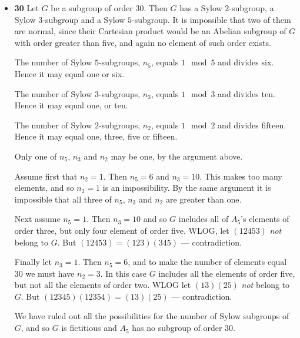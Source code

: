\documentclass[11pt]{article} \usepackage{amssymb}
\begin{document}
\begin{enumerate}
\begin{itemize}
    \item {\bf 30}
      Let $G$ be a subgroup of order 30. Then $G$ has a Sylow 
      $2$-subgroup, a Sylow $3$-subgroup and a Sylow $5$-subgroup. 
      It is impossible that two of them are normal, since their
      Cartesian product would be an Abelian subgroup of $G$ with order 
      greater than five, and again no element of such order exists.

      The number of Sylow $5$-subgroups, $n_5$, equals $1\mod 5$ and 
      divides six. Hence it may equal one or six.

      The number of Sylow $3$-subgroups, $n_3$, equals $1\mod 3$ and 
      divides ten. Hence it may equal one, or ten.

      The number of Sylow $2$-subgroups, $n_2$, equals $1\mod 2$ and 
      divides fifteen. Hence it may equal one, three, five or fifteen.

      Only one of $n_5$, $n_3$ and $n_2$ may be one, by the argument above.

      Assume first that $n_2=1$. Then $n_5=6$ and $n_3=10$. This makes too 
      many elements, and so $n_2=1$ is an impossibility. By the same argument
      it is impossible that all three of $n_5$, $n_3$ and $n_2$ are greater 
      than one.

      Next assume $n_5=1$. Then $n_3=10$ and so $G$ includes all of $A_5$'s 
      elements of order three, but only four element of order five. WLOG,
      let $(12453)$ {\em not} belong to $G$. But $(12453)=(123)(345)$ --- contradiction.

      Finally let $n_3=1$. Then $n_5=6$, and to make the number of elements
      equal 30 we must have $n_2=3$. In this case $G$ includes all the elements
      of order five, but not all the elements of order two. WLOG let 
      $(13)(25)$ {\em not} belong to $G$. But $(12345)(12354)=(13)(25)$ ---
      contradiction. 

      We have ruled out all the possibilities for the number of Sylow subgroups
      of $G$, and so $G$ is fictitious and $A_5$ has no subgroup of order 30.
    \end{itemize}
\end{enumerate}
\end{document}
